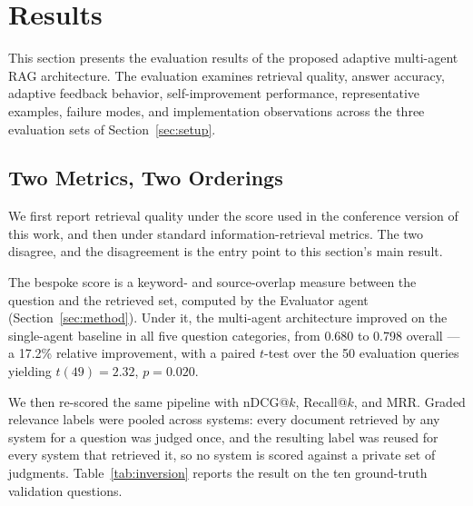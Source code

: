 \documentclass[acmsmall,review,anonymous,screen]{acmart}
\begin{document}
\section{Results}\label{sec:results}

This section presents the evaluation results of the proposed adaptive
multi-agent RAG architecture. The evaluation examines retrieval quality,
answer accuracy, adaptive feedback behavior, self-improvement
performance, representative examples, failure modes, and implementation
observations across the three evaluation sets of Section~\ref{sec:setup}.

\subsection{Two Metrics, Two Orderings}\label{sec:two-metrics}

We first report retrieval quality under the score used in the conference
version of this work, and then under standard information-retrieval metrics.
The two disagree, and the disagreement is the entry point to this section's
main result.

The bespoke score is a keyword- and source-overlap measure between the question
and the retrieved set, computed by the Evaluator agent
(Section~\ref{sec:method}). Under it, the multi-agent architecture improved on
the single-agent baseline in all five question categories, from 0.680 to 0.798
overall --- a 17.2\% relative improvement, with a paired $t$-test over the 50
evaluation queries yielding $t(49)=2.32$, $p=0.020$.

We then re-scored the same pipeline with nDCG@$k$, Recall@$k$, and MRR. Graded
relevance labels were pooled across systems: every document retrieved by any
system for a question was judged once, and the resulting label was reused for
every system that retrieved it, so no system is scored against a private set of
judgments. Table~\ref{tab:inversion} reports the result on the ten
ground-truth validation questions.
\end{document}
